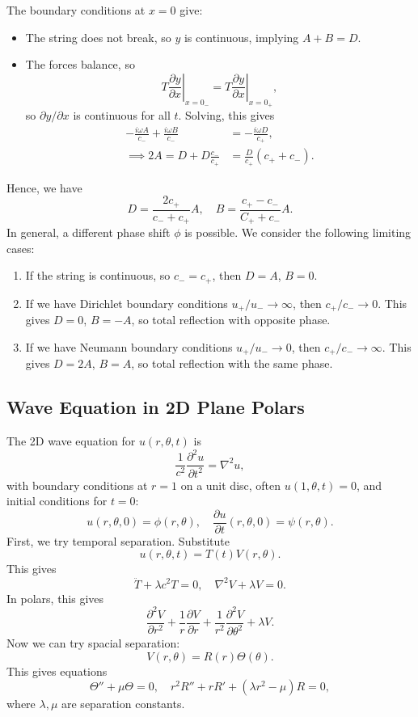 \documentclass[12pt]{article}
\begin{document}
The boundary conditions at $x = 0$ give:
\begin{itemize}
	\item The string does not break, so $y$ is continuous, implying $A + B = D$.
	\item The forces balance, so
		\[
			T \left. \frac{\partial y}{\partial x}\right|_{x = 0_{-}} = T \left. \frac{\partial y}{\partial x} \right|_{x = 0_{+}}
		,\]
		so $\partial y/\partial x$ is continuous for all $t$. Solving, this gives
		\begin{align*}
			- \frac{i \omega A}{c_{-}} + \frac{i \omega B}{c_{-}} &= - \frac{i \omega D}{c_{+}}, \\
			\implies 2A = D + D\frac{c_{-}}{c_{+}} &= \frac{D}{c_{+}}(c_{+} + c_{-}).
		\end{align*}
\end{itemize}
Hence, we have
\[
D = \frac{2 c_{+}}{c_{-} + c_{+}} A, \quad B = \frac{c_{+} - c_{-}}{C_{+} + c_{-}} A
.\]
In general, a different phase shift $\phi$ is possible. We consider the following limiting cases:
\begin{enumerate}[1)]
	\item If the string is continuous, so $c_{-} = c_{+}$, then $D = A$, $B = 0$.
	\item If we have Dirichlet boundary conditions $u_{+}/u_{-} \to \infty$, then $c_{+}/c_{-} \to 0$. This gives $D = 0$, $B = -A$, so total reflection with opposite phase.
	\item If we have Neumann boundary conditions $u_{+}/u_{-} \to 0$, then $c_{+}/c_{-} \to \infty$. This gives $D = 2A$, $B = A$, so total reflection with the same phase.
\end{enumerate}

\subsection{Wave Equation in 2D Plane Polars}%
\label{sub:wave_equation_in_2d_plane_polars}


The 2D wave equation for $u(r, \theta, t)$ is
\[
\frac{1}{c^2} \frac{\partial^2 u}{\partial t^2} = \nabla^2 u
,\]
with boundary conditions at $r = 1$ on a unit disc, often $u(1, \theta, t) = 0$, and initial conditions for $t = 0$:
\[
	u(r, \theta, 0) = \phi(r, \theta), \quad \frac{\partial u}{\partial t}(r, \theta, 0) = \psi (r, \theta)
.\]
First, we try temporal separation. Substitute
\[
	u(r, \theta, t) = T(t) V(r, \theta)
.\]
This gives
\[
\ddot T + \lambda c^2 T = 0, \quad \nabla^2 V + \lambda V = 0
.\]
In polars, this gives
\[
\frac{\partial^2 V}{\partial r^2} + \frac{1}{r} \frac{\partial V}{\partial r} + \frac{1}{r^2} \frac{\partial^2 V}{\partial \theta^2} + \lambda V
.\]
Now we can try spacial separation:
\[
	V(r, \theta) = R(r) \Theta(\theta)
.\]
This gives equations
\[
	\Theta'' + \mu \Theta = 0, \quad r^2 R'' + r R' + (\lambda r^2 - \mu)R = 0
,\]
where $\lambda, \mu$ are separation constants.
\end{document}
